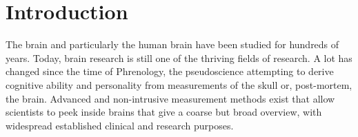 \documentclass[a4paper, 10pt, english, onecolumn]{article}
\title{\fontfamily{phv}\selectfont{Causal Discovery methods for Effective Connectivity in Human Brains}}
\author{
  \textbf{R. Janssen} - \href{mailto:ramon.janssen@student.ru.nl}{ramon.janssen@student.ru.nl} \\
  \textbf{T. de Ruijter} - \href{mailto:t.deruijter@student.ru.nl}{t.deruijter@student.ru.nl}\\
}
\date{\fontfamily{ptm}\selectfont{\small{\bfseries{\today - Radboud
Universiteit Nijmegen}}}\\[0.5cm]\rule{\linewidth}{0.3mm}}
\begin{document}
\maketitle

\setlength{\parindent}{0.0cm}
\setlength{\parskip}{3mm plus2mm minus1.5mm}

\begin{abstract}
Many different approaches have been used to infer brain connectivity.
But few general causal discovery methods have yet been used to find effective connectivity.
In this article, we describe how the PC algorithm is used on functional brain-data.
This approach results in connectivity matrices which clearly show some well-known brain connections.
Some disadvantages of the PC algorithm for this use are discussed, and an attempt is made to decrease these disadvantages by making adjustments to the algorithm.
Causal relations have only be found with very low certainty. 
\end{abstract}

\section{Introduction}
The brain and particularly the human brain have been studied for hundreds of years.
Today, brain research is still one of the thriving fields of research.
A lot has changed since the time of Phrenology, the pseudoscience attempting to derive cognitive ability and personality from measurements of the skull or, post-mortem, the brain.
Advanced and non-intrusive measurement methods exist that allow scientists to peek inside brains that give a coarse but broad overview, with widespread established clinical and research purposes.
\end{document}
